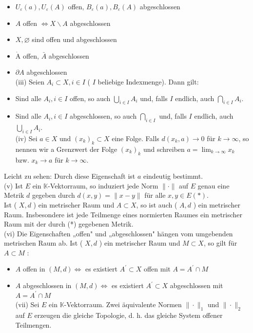 \documentclass[10pt, letterpaper]{article}
\begin{document}
\begin{itemize}
  \item $U_{\varepsilon}(a), U_{\varepsilon}(A)$ offen, $B_{\varepsilon}(a), B_{\varepsilon}(A)$ abgeschlossen
  \item $A$ offen $\Longleftrightarrow X \backslash A$ abgeschlossen
  \item $X, \varnothing$ sind offen und abgeschlossen
  \item $\mathring{\mathrm{A}}$ offen, $\bar{A}$ abgeschlossen
  \item $\partial A$ abgeschlossen\\
(iii) Seien $A_{i} \subset X, i \in I$ ( $I$ beliebige Indexmenge). Dann gilt:
  \item Sind alle $A_{i}, i \in I$ offen, so auch $\bigcup_{i \in I} A_{i}$ und, falls $I$ endlich, auch $\bigcap_{i \in I} A_{i}$.
  \item Sind alle $A_{i}, i \in I$ abgeschlossen, so auch $\bigcap_{i \in I}$ und, falls $I$ endlich, auch $\bigcup_{i \in I} A_{i}$.\\
(iv) Sei $a \in X$ und $\left(x_{k}\right)_{k} \subset X$ eine Folge. Falls $d\left(x_{k}, a\right) \rightarrow 0$ für $k \rightarrow \infty$, so nennen wir a Grenzwert der Folge $\left(x_{k}\right)_{k}$ und schreiben $a=\lim _{k \rightarrow \infty} x_{k}$ bzw. $x_{k} \rightarrow a$ für $k \rightarrow \infty$.
\end{itemize}

Leicht zu sehen: Durch diese Eigenschaft ist $a$ eindeutig bestimmt.\\
(v) Ist $E$ ein $\mathbb{K}$-Vektorraum, so induziert jede Norm $\|\cdot\|$ auf $E$ genau eine Metrik $d$ gegeben durch $d(x, y)=\|x-y\|$ für alle $x, y \in E(*)$.\\
Ist ( $X, d$ ) ein metrischer Raum und $A \subset X$, so ist auch ( $A, d$ ) ein metrischer Raum. Insbesondere ist jede Teilmenge eines normierten Raumes ein metrischer Raum mit der durch (*) gegebenen Metrik.\\
(vi) Die Eigenschaften „offen" und „abgeschlossen" hängen vom umgebenden metrischen Raum ab. Ist ( $X, d$ ) ein metrischer Raum und $M \subset X$, so gilt für $A \subset M$ :

\begin{itemize}
  \item $A$ offen in $(M, d) \Longleftrightarrow$ es existiert $A^{\prime} \subset X$ offen mit $A=A^{\prime} \cap M$
  \item $A$ abgeschlossen in $(M, d) \Longleftrightarrow$ es existiert $A^{\prime} \subset X$ abgeschlossen mit $A=A^{\prime} \cap M$\\
(vii) Sei $E$ ein $\mathbb{K}$-Vektorraum. Zwei äquivalente Normen $\|\cdot\|_{1}$ und $\|\cdot\|_{2}$ auf $E$ erzeugen die gleiche Topologie, d. h. das gleiche System offener Teilmengen.
\end{itemize}
\end{document}
